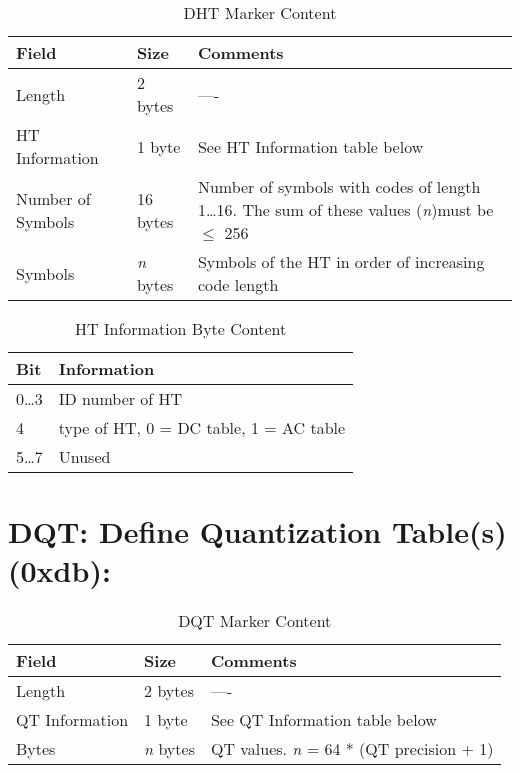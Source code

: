 \begin{table}[!hbtp]
	\label{dht-content}
	\caption{DHT Marker Content}
	\centering
	\begin{tabular}{ | p{2cm} | p{1.5cm} | p{4cm} | }
	\hline
	\textbf{Field} & \textbf{Size} & \textbf{Comments} \\ \hline
	Length & 2 bytes & ----\\ \hline
	HT Information & 1 byte & See HT Information table below\\ \hline
	Number of Symbols  & 16 bytes & Number of symbols with codes of length 1\ldots16.
	The sum of these values (\emph{n})must be $\le$ 256\\ \hline
	Symbols  & \emph{n} bytes & Symbols of the HT in order of increasing code length\\ \hline
	\end{tabular}
\end{table}

\begin{table}[!hbtp]
	\label{dht-info-content}
	\caption{HT Information Byte Content}
	\centering
	\begin{tabular}{ | p{2cm} | p{4cm} | }
	\hline
	\textbf{Bit} &  \textbf{Information} \\ \hline
	0\ldots3 & ID number of HT\\ \hline
	4 & type of HT, 0 = DC table, 1 = AC table\\ \hline
	5\ldots7 & Unused\\ \hline
	\end{tabular}
\end{table}

\section{DQT: Define Quantization Table(s) (0xdb):}

\begin{table}[!hbtp]
	\label{dqt-content}
	\caption{DQT Marker Content}
	\centering
	\begin{tabular}{ | p{2cm} | p{1.5cm} | p{4cm} | }
	\hline
	\textbf{Field} & \textbf{Size} & \textbf{Comments} \\ \hline
	Length & 2 bytes & ----\\ \hline
	QT Information & 1 byte & See QT Information table below\\ \hline
	Bytes  & \emph{n} bytes & QT values. \emph{n} = 64 * (QT precision + 1) \\ \hline
	\end{tabular}
\end{table}

